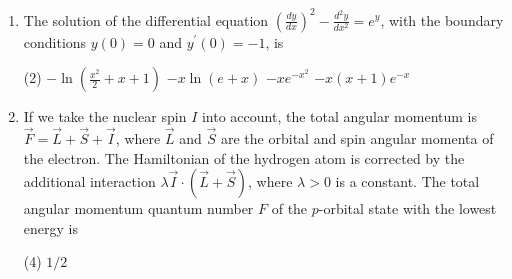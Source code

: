 \begin{enumerate}
$$
G(t, \tau)=\left\{\begin{array}{llc}
0 & \text { for } & 0<t<\tau \\
\sin (t-\tau) & \text { for } & t>\tau
\end{array}\right.
$$
The solution of the differential equation when the source $f(t)=\theta(t)$ (the Heaviside step function) is
 \begin{tasks}(4)
	\task[\textbf{a.}]$\sin t$
	\task[\textbf{b.}]$1-\sin t$
	\task[\textbf{c.}]$1-\cos t$
	\task[\textbf{d.}]$\cos ^{2} t-1$ 
\end{tasks}
\begin{answer}
	\begin{align*}
	\frac{d^{2} x}{d t^{2}}+x&=f(t) \text { and } \quad x(0)=\dot{x}(0)=0\\
	G(t, \tau)&= \begin{cases}0, & 0<t<\tau \\
	\sin (t-\tau), \quad t>\tau\end{cases} \\
	x(t)&=\int_{0}^{\infty} G(t, \tau) f(\tau) d \tau \\
	\Rightarrow x(t)&=\int_{0}^{t} \sin (t-\tau) f(\tau) d \tau=\int_{0}^{t} \sin (t-\tau) d \tau=+\left.\cos (t-\tau)\right|_{0} ^{t}=1-\cos t
	\end{align*}
	So the correct answer is \textbf{Option (c)}
\end{answer}
		So the correct answer is \textbf{Option (c)}
\item The solution of the differential equation $\left(\frac{d y}{d x}\right)^{2}-\frac{d^{2} y}{d x^{2}}=e^{y}$, with the boundary conditions $y(0)=0$ and $y^{\prime}(0)=-1$, is
 \begin{tasks}(2)
	\task[\textbf{a.}]$-\ln \left(\frac{x^{2}}{2}+x+1\right)$
	\task[\textbf{b.}]$-x \ln (e+x)$
	\task[\textbf{c.}]$-x e^{-x^{2}}$
	\task[\textbf{d.}] $-x(x+1) e^{-x}$
\end{tasks}
\item  If we take the nuclear spin $I$ into account, the total angular momentum is $\vec{F}=\vec{L}+\vec{S}+\vec{I}$, where $\vec{L}$ and $\vec{S}$ are the orbital and spin angular momenta of the electron. The Hamiltonian of the hydrogen atom is corrected by the additional interaction $\lambda \vec{I} \cdot(\vec{L}+\vec{S})$, where $\lambda>0$ is a constant. The total angular momentum quantum number $F$ of the $p$-orbital state with the lowest energy is
 \begin{tasks}(4)
	\task[\textbf{c.}]$1 / 2$

\end{tasks}
\end{enumerate}
